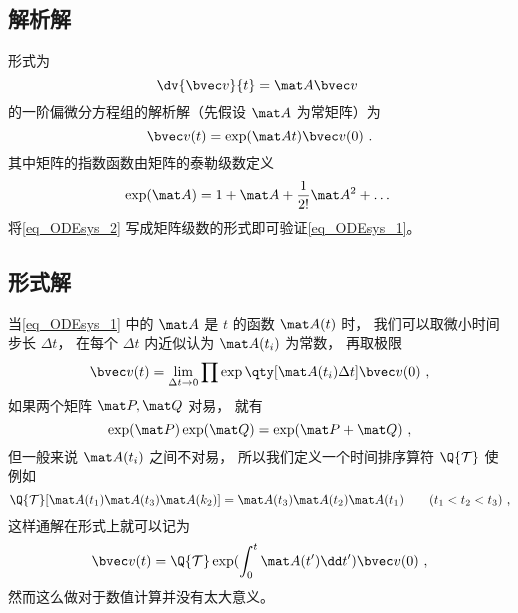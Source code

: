 

\subsection{解析解}
形式为
\begin{equation}\label{eq_ODEsys_1}
\dv{\bvec v}{t} = \mat A \bvec v~
\end{equation}
的一阶偏微分方程组的解析解（先假设 $\mat A$ 为常矩阵）为
\begin{equation}\label{eq_ODEsys_2}
\bvec v(t) = \exp(\mat At) \bvec v(0)~.
\end{equation}
其中矩阵的指数函数由矩阵的泰勒级数定义
\begin{equation}\label{eq_ODEsys_4}
\exp(\mat A) = 1 + \mat A + \frac1{2!} \mat A^2 + \dots~
\end{equation}
将\autoref{eq_ODEsys_2} 写成矩阵级数的形式即可验证\autoref{eq_ODEsys_1}。

\subsection{形式解}
当\autoref{eq_ODEsys_1} 中的 $\mat A$ 是 $t$ 的函数 $\mat A(t)$ 时， 我们可以取微小时间步长 $\Delta t$， 在每个 $\Delta t$ 内近似认为 $\mat A(t_i)$ 为常数， 再取极限
\begin{equation}
\bvec v(t) = \lim_{\Delta t \to 0} \prod \exp\qty[\mat A(t_i)\Delta t] \bvec v(0)~,
\end{equation}
如果两个矩阵 $\mat P, \mat Q$ 对易， 就有
\begin{equation}
\exp(\mat P)\exp(\mat Q) = \exp(\mat P + \mat Q)~,
\end{equation}
但一般来说 $\mat A(t_i)$ 之间不对易， 所以我们定义一个时间排序算符 $\Q{\mathcal T}$ 使例如
\begin{equation}
\Q {\mathcal T} [\mat A(t_1) \mat A(t_3) \mat A(k_2)] = \mat A(t_3) \mat A(t_2) \mat A(t_1) \qquad ( t_1 < t_2 < t_3 )~,
\end{equation}
这样通解在形式上就可以记为
\begin{equation}\label{eq_ODEsys_3}
\bvec v(t) = \Q {\mathcal T} \exp(\int_0^ t \mat A(t')\dd t') \bvec v(0)~,
\end{equation}
然而这么做对于数值计算并没有太大意义。

